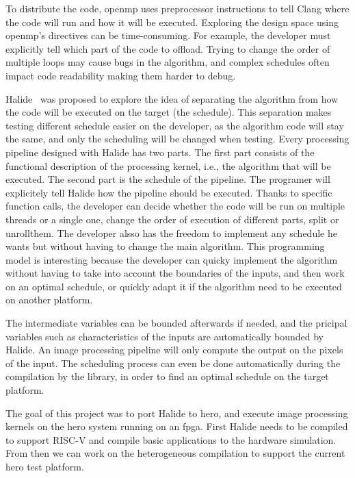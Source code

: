     To distribute the code, \gls{openmp} uses preprocessor instructions to tell Clang where the code will run and how it will be executed. Exploring the design space using \gls{openmp}'s directives can be time-consuming. For example, the developer must explicitly tell which part of the code to offload. Trying to change the order of multiple loops may cause bugs in the algorithm, and complex schedules often impact code readability making them harder to debug.

    Halide~\cite{Art:Halide} was proposed to explore the idea of separating the algorithm from how the code will be executed on the target (the schedule).
    This separation makes testing different schedule easier on the developer, as the algorithm code will stay the same, and only the scheduling will be changed when testing.
    Every processing pipeline designed with Halide has two parts. The first part consists of the functional description of the processing kernel, i.e., the algorithm that will be executed. 
	The second part is the schedule of the pipeline. The programer will explicitely tell Halide how the pipeline should be executed. Thanks to specific function calls, the developer can decide whether the code will be run on multiple threads or a single one, change the order of execution of different parts, split or unrollthem. The developer alsso has the freedom to implement any schedule he wants but without having to change the main algorithm.
    This programming model is interesting because the developer can quicky implement the algorithm without having to take into account the boundaries of the inputs, and then work on an optimal schedule, or quickly adapt it if the algorithm need to be executed on another platform.

    The intermediate variables can be bounded afterwards if needed, and the pricipal variables such as characteristics of the inputs are automatically bounded by Halide. An image processing pipeline will only compute the output on the pixels of the input.
    The scheduling process can even be done automatically during the compilation by the library, in order to find an optimal schedule on the target platform.

	The goal of this project was to port Halide to \gls{hero}, and execute image processing kernels on the \gls{hero} system running on an \gls{fpga}. First Halide needs to be compiled to support RISC-V and compile basic applications to the hardware simulation. From then we can work on the heterogeneous compilation to support the current \gls{hero} test platform.

